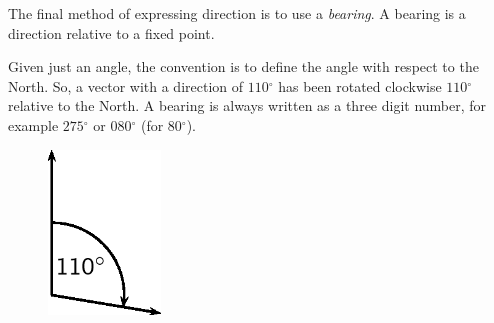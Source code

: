         
        \label{m38812*id187384}The final method of expressing direction is to use a \textsl{bearing}. A bearing is a direction relative to a fixed point.\par 
        \label{m38812*id187393}Given just an angle, the convention is to define the angle with respect to the North. So, a vector with a direction of \begin{math}110{}^{\circ }\end{math} has been rotated clockwise \begin{math}110{}^{\circ }\end{math} relative to the North. A bearing is always written as a three digit number, for example \begin{math}275{}^{\circ }\end{math} or \begin{math}080{}^{\circ }\end{math} (for \begin{math}80{}^{\circ }\end{math}).\par 
        \label{m38812*id187459}
          
    \setcounter{subfigure}{0}


	\begin{figure}[H] %
    \begin{center}
    \label{m38812*id187462!!!underscore!!!media}\label{m38812*id187462!!!underscore!!!printimage}\includegraphics[width=3cm]{col11305.imgs/m38812_PG11C1_006.png} %
        
      \vspace{2pt}
    \vspace{.1in}
    
    \end{center}

 \end{figure}   

    \addtocounter{footnote}{-0}
    
        \par 
\label{m38812*secfhsst!!!underscore!!!id146}
